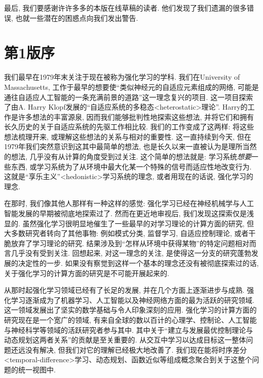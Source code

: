 最后, 我们要感谢许许多多的本版在线草稿的读者. 他们发现了我们遗漏的很多错误, 也就一些潜在的困惑点向我们发出警告.
\clearpage

{}
\section*{第1版序}\label{sec:pautoreface_1}


我们最早在1979年末关注于现在被称为强化学习的学科. 我们在University of Massachusetts, 工作于最早的想要使``类似神经元的自适应元素组成的网络, 可能是通往自适应人工智能的一条充满前景的道路''这一理念复兴的项目. 这一项目探索了由A. Harry Klopf发展的``自适应系统的多稳态<heterostatic>理论''. Harry的工作是许多想法的丰富源泉, 因而我们能够批判性地探索这些想法, 并将它们和拥有长久历史的关于自适应系统的先驱工作相比较. 我们的工作变成了这两样: 将这些想法梳理开来, 或理解这些想法的关系与相对的重要性. 这一直持续到今天, 但在1979年我们突然意识到这其中最简单的想法, 也是长久以来一直被认为是理所当然的想法, 几乎没有从计算的角度受到过关注. 这个简单的想法就是: 学习系统\emph{想要}一些东西, 或学习系统为了从环境中最大化某一个特殊的信号而适应性地改变行为. 这就是``享乐主义''<hedonistic>学习系统的理念, 或者用现在的话说, 强化学习的理念.

在那时, 我们像其他人那样有一种这样的感觉: 强化学习已经在神经机械学与人工智能发展的早期被彻底地探索过了. 然而在更近地审视后, 我们发现这探索仅是浅显的. 虽然强化学习很明显地催生了一些最早的对学习理论的计算方面的研究, 但大多数研究者转向了其他事物: 例如模式分类, 监督学习, 自适应控制理论, 或者干脆放弃了学习理论的研究. 结果涉及到``怎样从环境中获得某物''的特定问题相对而言几乎没有受到关注. 回想起来, 对这一理念的关注, 是使得这一分支的研究蓬勃发展的决定性的一步. 如果没有察觉到这样一个基本的理念还没有被彻底探索过的话, 关于强化学习的计算方面的研究是不可能开展起来的.

从那时起强化学习领域已经有了长足的发展, 并在几个方面上逐渐进步与成熟. 强化学习逐渐成为了机器学习、人工智能以及神经网络方面的最为活跃的研究领域. 这一领域发展出了坚实的数学基础与令人印象深刻的应用. 强化学习的计算方面的研究现在是一个宽广的领域, 有来自全球的数以百计的心理学、控制论、人工智能与神经科学等领域的活跃研究者参与其中. 其中关于``建立与发展最优控制理论与动态规划这两者关系''的贡献是至关重要的. 从交互中学习以达成目标这一整体问题还远没有解决, 但我们对它的理解已经极大地改善了. 我们现在能将时序差分<temporal-difference>学习、动态规划、函数近似等组成概念聚合到关于这整个问题的统一视图中. 

